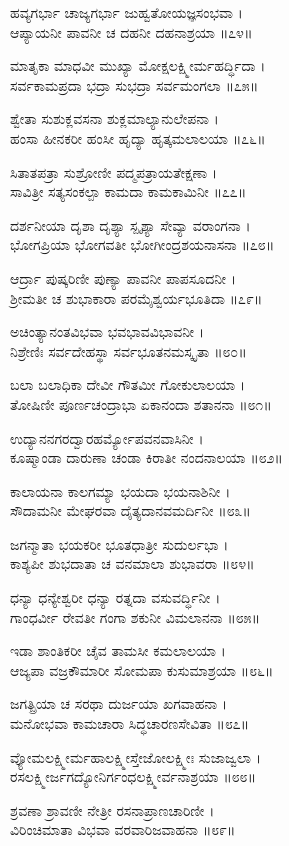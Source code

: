 ಹವ್ಯಗರ್ಭಾ ಚಾಜ್ಯಗರ್ಭಾ ಜುಹ್ವತೋಯಜ್ಞಸಂಭವಾ ।\\
ಆಪ್ಯಾಯನೀ ಪಾವನೀ ಚ ದಹನೀ ದಹನಾಶ್ರಯಾ ॥೭೪॥

ಮಾತೃಕಾ ಮಾಧವೀ ಮುಖ್ಯಾ ಮೋಕ್ಷಲಕ್ಷ್ಮೀರ್ಮಹರ್ದ್ಧಿದಾ ।\\
ಸರ್ವಕಾಮಪ್ರದಾ ಭದ್ರಾ ಸುಭದ್ರಾ ಸರ್ವಮಂಗಲಾ ॥೭೫॥

ಶ್ವೇತಾ ಸುಶುಕ್ಲವಸನಾ ಶುಕ್ಲಮಾಲ್ಯಾನುಲೇಪನಾ ।\\
ಹಂಸಾ ಹೀನಕರೀ ಹಂಸೀ ಹೃದ್ಯಾ ಹೃತ್ಕಮಲಾಲಯಾ ॥೭೬॥

ಸಿತಾತಪತ್ರಾ ಸುಶ್ರೋಣೀ ಪದ್ಮಪತ್ರಾಯತೇಕ್ಷಣಾ ।\\
ಸಾವಿತ್ರೀ ಸತ್ಯಸಂಕಲ್ಪಾ ಕಾಮದಾ ಕಾಮಕಾಮಿನೀ ॥೭೭॥

ದರ್ಶನೀಯಾ ದೃಶಾ ದೃಶ್ಯಾ ಸ್ಪೃಶ್ಯಾ ಸೇವ್ಯಾ ವರಾಂಗನಾ ।\\
ಭೋಗಪ್ರಿಯಾ ಭೋಗವತೀ ಭೋಗೀಂದ್ರಶಯನಾಸನಾ ॥೭೮॥

ಆರ್ದ್ರಾ ಪುಷ್ಕರಿಣೀ ಪುಣ್ಯಾ ಪಾವನೀ ಪಾಪಸೂದನೀ ।\\
ಶ್ರೀಮತೀ ಚ ಶುಭಾಕಾರಾ ಪರಮೈಶ್ವರ್ಯಭೂತಿದಾ ॥೭೯॥

ಅಚಿಂತ್ಯಾನಂತವಿಭವಾ ಭವಭಾವವಿಭಾವನೀ ।\\
ನಿಶ್ರೇಣಿಃ ಸರ್ವದೇಹಸ್ಥಾ ಸರ್ವಭೂತನಮಸ್ಕೃತಾ ॥೮೦॥

ಬಲಾ ಬಲಾಧಿಕಾ ದೇವೀ ಗೌತಮೀ ಗೋಕುಲಾಲಯಾ ।\\
ತೋಷಿಣೀ ಪೂರ್ಣಚಂದ್ರಾಭಾ ಏಕಾನಂದಾ ಶತಾನನಾ ॥೮೧॥

ಉದ್ಯಾನನಗರದ್ವಾರಹರ್ಮ್ಯೋಪವನವಾಸಿನೀ ।\\
ಕೂಷ್ಮಾಂಡಾ ದಾರುಣಾ ಚಂಡಾ ಕಿರಾತೀ ನಂದನಾಲಯಾ ॥೮೨॥

ಕಾಲಾಯನಾ ಕಾಲಗಮ್ಯಾ ಭಯದಾ ಭಯನಾಶಿನೀ ।\\
ಸೌದಾಮನೀ ಮೇಘರವಾ ದೈತ್ಯದಾನವಮರ್ದಿನೀ ॥೮೩॥

ಜಗನ್ಮಾತಾ ಭಯಕರೀ ಭೂತಧಾತ್ರೀ ಸುದುರ್ಲಭಾ ।\\
ಕಾಶ್ಯಪೀ ಶುಭದಾತಾ ಚ ವನಮಾಲಾ ಶುಭಾವರಾ ॥೮೪॥

ಧನ್ಯಾ ಧನ್ಯೇಶ್ವರೀ ಧನ್ಯಾ ರತ್ನದಾ ವಸುವರ್ದ್ಧಿನೀ ।\\
ಗಾಂಧರ್ವೀ ರೇವತೀ ಗಂಗಾ ಶಕುನೀ ವಿಮಲಾನನಾ ॥೮೫॥

ಇಡಾ ಶಾಂತಿಕರೀ ಚೈವ ತಾಮಸೀ ಕಮಲಾಲಯಾ ।\\
ಆಜ್ಯಪಾ ವಜ್ರಕೌಮಾರೀ ಸೋಮಪಾ ಕುಸುಮಾಶ್ರಯಾ ॥೮೬॥

ಜಗತ್ಪ್ರಿಯಾ ಚ ಸರಥಾ ದುರ್ಜಯಾ ಖಗವಾಹನಾ ।\\
ಮನೋಭವಾ ಕಾಮಚಾರಾ ಸಿದ್ಧಚಾರಣಸೇವಿತಾ ॥೮೭॥

ವ್ಯೋಮಲಕ್ಷ್ಮೀರ್ಮಹಾಲಕ್ಷ್ಮೀಸ್ತೇಜೋಲಕ್ಷ್ಮೀಃ ಸುಜಾಜ್ವಲಾ ।\\
ರಸಲಕ್ಷ್ಮೀರ್ಜಗದ್ಯೋನಿರ್ಗಂಧಲಕ್ಷ್ಮೀರ್ವನಾಶ್ರಯಾ ॥೮೮॥

ಶ್ರವಣಾ ಶ್ರಾವಣೀ ನೇತ್ರೀ ರಸನಾಪ್ರಾಣಚಾರಿಣೀ ।\\
ವಿರಿಂಚಿಮಾತಾ ವಿಭವಾ ವರವಾರಿಜವಾಹನಾ ॥೮೯॥

